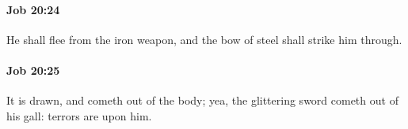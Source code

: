 		\paragraph{Job 20:24} %
			\label{JOB-20-24}

			He shall flee from the iron weapon, and the bow of steel shall strike him through.


		\paragraph{Job 20:25} %
			\label{JOB-20-25}

			It is drawn, and cometh out of the body; yea, the glittering sword cometh out of his gall: terrors are upon him.



